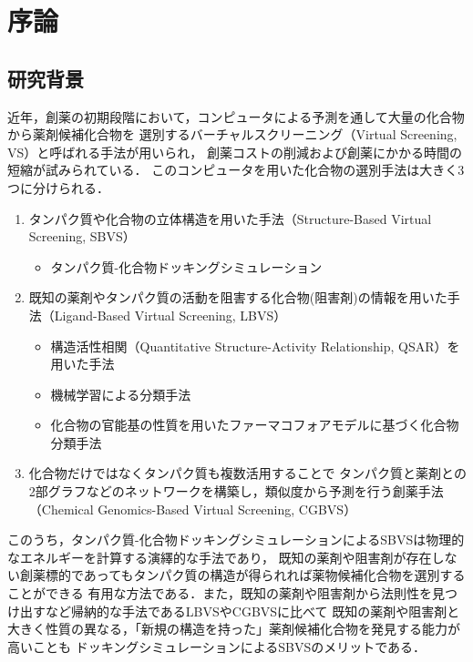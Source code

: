 \chapter{序論}
\section{研究背景}\label{sec:background}
近年，創薬の初期段階において，コンピュータによる予測を通して大量の化合物から薬剤候補化合物を
選別するバーチャルスクリーニング（Virtual Screening, VS）と呼ばれる手法が用いられ，
創薬コストの削減および創薬にかかる時間の短縮が試みられている．
このコンピュータを用いた化合物の選別手法は大きく3つに分けられる．

\begin{enumerate}
\item タンパク質や化合物の立体構造を用いた手法（Structure-Based Virtual Screening, SBVS）
	\begin{itemize}
	\item タンパク質-化合物ドッキングシミュレーション\cite{Friesner2004, Zsoldos2007, Morris2009}
	\end{itemize}
\item 既知の薬剤やタンパク質の活動を阻害する化合物(阻害剤)の情報を用いた手法（Ligand-Based Virtual Screening, LBVS）
	\begin{itemize}
	\item 構造活性相関（Quantitative Structure-Activity Relationship, QSAR）を用いた手法\cite{Hansch1964}
	\item 機械学習による分類手法\cite{Ivanciuc2007}
	\item 化合物の官能基の性質を用いたファーマコフォアモデルに基づく化合物分類手法\cite{Wolber2008}
	\end{itemize}
\item 化合物だけではなくタンパク質も複数活用することで
	タンパク質と薬剤との2部グラフなどのネットワークを構築し，類似度から予測を行う創薬手法 
	（Chemical Genomics-Based Virtual Screening, CGBVS）\cite{Brown2012}
\end{enumerate}

このうち，タンパク質-化合物ドッキングシミュレーションによるSBVSは物理的なエネルギーを計算する演繹的な手法であり，
既知の薬剤や阻害剤が存在しない創薬標的であってもタンパク質の構造が得られれば薬物候補化合物を選別することができる
有用な方法である．また，既知の薬剤や阻害剤から法則性を見つけ出すなど帰納的な手法であるLBVSやCGBVSに比べて
既知の薬剤や阻害剤と大きく性質の異なる，「新規の構造を持った」薬剤候補化合物を発見する能力が高いことも
ドッキングシミュレーションによるSBVSのメリットである．

